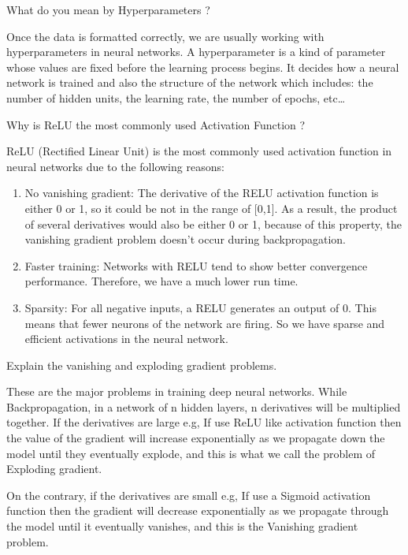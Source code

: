\documentclass[12pt,a4paper]{exam}
\begin{document}

\question
What do you mean by Hyperparameters ?
\fillwithlines{3cm}
\begin{solution}
Once the data is formatted correctly, we are usually working with hyperparameters in neural networks. A hyperparameter is a kind of parameter whose values are fixed before the learning process begins.
It decides how a neural network is trained and also the structure of the network which includes: the number of hidden units, the learning rate, the number of epochs, etc\ldots
\end{solution}


\question
Why is ReLU the most commonly used Activation Function ?
\fillwithlines{3cm}
\begin{solution}
ReLU (Rectified Linear Unit) is the most commonly used activation function in neural networks due to the following reasons:
\begin{enumerate}
\item No vanishing gradient: The derivative of the RELU activation function is either 0 or 1, so it could be not in the range of [0,1]. As a result, the product of several derivatives would also be either 0 or 1, because of this property, the vanishing gradient problem doesn’t occur during backpropagation.
\item Faster training: Networks with RELU tend to show better convergence performance. Therefore, we have a much lower run time.
\item Sparsity: For all negative inputs, a RELU generates an output of 0. This means that fewer neurons of the network are firing. So we have sparse and efficient activations in the neural network.
\end{enumerate}
\end{solution}


\question
Explain the vanishing and exploding gradient problems.
\fillwithlines{3cm}
\begin{solution}
These are the major problems in training deep neural networks.
While Backpropagation, in a network of n hidden layers, n derivatives will be multiplied together. If the derivatives are large e.g, If use ReLU like activation function then the value of the gradient will increase exponentially as we propagate down the model until they eventually explode, and this is what we call the problem of Exploding gradient.

On the contrary, if the derivatives are small e.g, If use a Sigmoid activation function then the gradient will decrease exponentially as we propagate through the model until it eventually vanishes, and this is the Vanishing gradient problem.
\end{solution}
\end{document}

